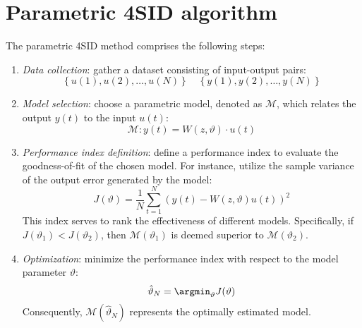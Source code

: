 \section{Parametric 4SID algorithm}

The parametric 4SID method comprises the following steps:
\begin{enumerate}
    \item \textit{Data collection}: gather a dataset consisting of input-output pairs:
        \[\left\{ u(1),u(2),\dots,u(N)\right\}\quad\left\{ y(1),y(2),\dots,y(N)\right\}\]
    \item \textit{Model selection}: choose a parametric model, denoted as $\mathcal{M}$, which relates the output $y(t)$ to the input $u(t)$:
        \[\mathcal{M}:y(t)=W(z,\vartheta)\cdot u(t)\]
    \item \textit{Performance index definition}: define a performance index to evaluate the goodness-of-fit of the chosen model. 
        For instance, utilize the sample variance of the output error generated by the model:
        \[J(\vartheta)=\dfrac{1}{N}\sum_{t=1}^N\left(y(t)-W(z,\vartheta)u(t)\right)^2\]
        This index serves to rank the effectiveness of different models. 
        Specifically, if $J(\vartheta_1)<J(\vartheta_2)$, then $\mathcal{M}(\vartheta_1)$ is deemed superior to $\mathcal{M}(\vartheta_2)$. 
    \item \textit{Optimization}: minimize the performance index with respect to the model parameter $\vartheta$:
        \[\hat{\vartheta}_N=\argmin_{\vartheta} J(\vartheta)\]
        Consequently, $\mathcal{M}(\hat{\vartheta}_N)$ represents the optimally estimated model.
\end{enumerate}